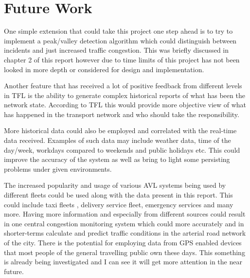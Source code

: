 \section{Future Work}
One simple extension that could take this project one step ahead is to try to implement a peak/valley detection algorithm which could distinguish between incidents and just increased traffic congestion. This was briefly discussed in chapter 2 of this report however due to time limits of this project has not been looked in more depth or considered for design and implementation.

Another feature that has received a lot of positive feedback from different levels in TFL is the ability to generate complex historical reports of what has been the network state. According to TFL this would provide more objective view of what has happened in the transport network and who should take the responsibility. 

More historical data could also be employed and correlated with the real-time data received. Examples of such data may include weather data, time of the day/week, workdays compared to weekends and public holidays etc. This could improve the accuracy of the system as well as bring to light some persisting problems under given environments.

The increased popularity and usage of various AVL systems being used by different fleets could be used along with the data present in this report. This could include taxi fleets \cite{rahmani2010requirements}, delivery service fleet, emergency services and many more. Having more information and especially from different sources could result in one central congestion monitoring system which could more accurately and in shorter-terms calculate and predict traffic conditions in the arterial road network of the city. There is the potential for employing data from GPS enabled devices that most people of the general travelling public own these days. This something is already being investigated \cite{thiagarajan2010cooperative} and I can see it will get more attention in the near future.



